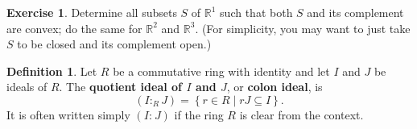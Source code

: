 \documentclass{amsart}
\theoremstyle{plain}
\theoremstyle{definition}
\newtheorem{definition}{Definition}
\newtheorem{exercise}[theorem]{Exercise}
\theoremstyle{definition}
\newcommand{\defining}[1]{\textbf{#1}}
\renewcommand{\colon}[3]{\ensuremath{\left(#1:_{#2} #3\right)}}
\newcommand{\R}{\mathbb{R}}
\begin{document}








\begin{exercise}
Determine all subsets $S$ of $\R^1$ such that
both $S$ and its complement are convex;  do the same for $\R^2$ and $\R^3$.
(For simplicity, you may want to just take $S$ to be closed and its complement open.)
\end{exercise}











\begin{definition}
Let $R$ be a commutative ring with identity and let $I$ and $J$ be ideals of $R$.
The \defining{quotient ideal of $I$ and $J$}, or \defining{colon ideal}, is
\[
\colon{I}{R}{J} = \left\{ r \in R \mid r J \subseteq I \right\}.
\]
It is often written simply $\colon{I}{}{J}$ if the ring $R$ is clear from the context.
\end{definition}
\end{document}
